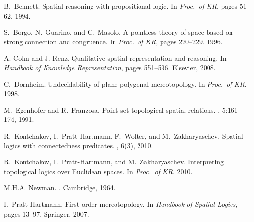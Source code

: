 \documentclass{article}
\begin{document}




\begin{thebibliography}{}\itemsep=1pt



B.~Bennett.
\newblock Spatial reasoning with propositional logic.
\newblock In {\em Proc.\ of KR}, pages 51--62.  1994.

S.~Borgo, N.~Guarino, and C.~Masolo.
\newblock A pointless theory of space based on strong connection and
  congruence.
\newblock In {\em Proc.\ of
  KR}, pages 220--229. 1996.

A. Cohn and J. Renz.
\newblock Qualitative spatial representation and reasoning.
\newblock In {\em
  Handbook of Kno\-w\-ledge Representation}, pages 551--596. Elsevier, 2008.

C.\ Dornheim.
\newblock Undecidability of plane po\-ly\-gonal mereo\-topology.
\newblock In {\em Proc.\ of KR}. 1998.


M.~Egenhofer and R.~Franzosa.
\newblock Point-set topological spatial relations.
,
  5:161--174, 1991.



R.~Kontchakov, I.~Pratt-Hartmann, F.~Wolter, and M.~Zakharyaschev.
\newblock Spatial logics with connectedness predicates.
, 6(3), 2010.

R.~Kontchakov, I.~Pratt-Hart\-mann, and M.~Zakharyaschev.
\newblock Interpreting topological logics over {E}uclidean spaces.
\newblock In {\em Proc.\
  of KR}. 2010.

M.H.A. Newman.
.
\newblock Cambridge, 1964.

I.~Pratt-Hartmann.
\newblock First-order mere\-o\-topology.
\newblock In {\em
  Handbook of Spatial Logics}, pages 13--97. Springer, 2007.


\end{thebibliography}
\end{document}
